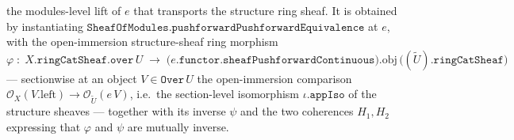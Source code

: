 \begin{definition}
\[  \]
  the modules-level lift of \(e\) that transports the structure ring sheaf. It is
  obtained by instantiating
  \(\mathtt{SheafOfModules.pushforwardPushforwardEquivalence}\) at \(e\), with the
  open-immersion structure-sheaf ring morphism
  \[
    \varphi \;:\;
      X.\mathtt{ringCatSheaf}.\mathtt{over}\,U
      \;\longrightarrow\;
      \bigl(e.\mathtt{functor}.\mathtt{sheafPushforwardContinuous}\bigr).\mathrm{obj}\,
        \bigl((\widetilde{U}).\mathtt{ringCatSheaf}\bigr)
  \]
  --- sectionwise at an object \(V \in \mathtt{Over}\,U\) the open-immersion
  comparison \(\mathcal{O}_X(V.\mathrm{left}) \to \mathcal{O}_{\widetilde{U}}(e\,V)\),
  i.e.\ the section-level isomorphism \(\iota.\mathtt{appIso}\) of the structure
  sheaves --- together with its inverse \(\psi\) and the two coherences
  \(H_1, H_2\) expressing that \(\varphi\) and \(\psi\) are mutually inverse.
\end{definition}


